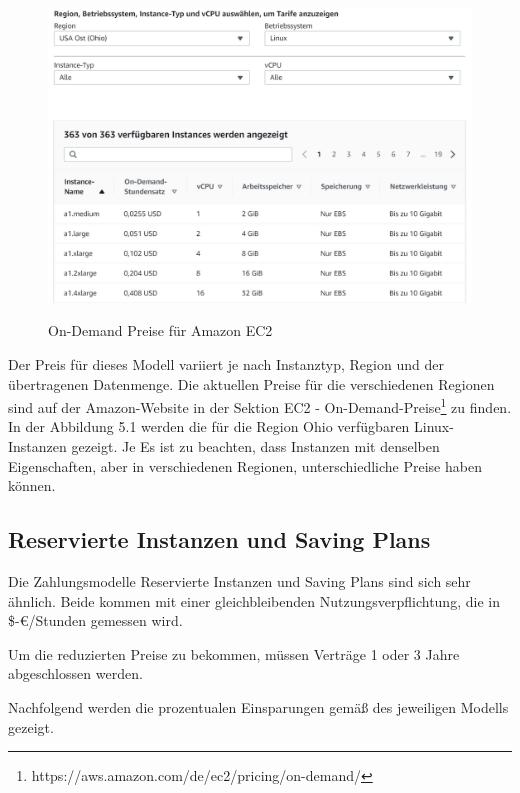 
\begin{figure}
    \centering
    \includegraphics[scale=0.4]{sources/On-Demand-Pläne für Amazon EC2}\label{fig:OnDemand_Preise}\\
    \caption[On-Demand Preise für Amazon EC2]{}
    \label{fig:OnDemand_Preise}  On-Demand Preise für Amazon EC2 {\cite{AMZ02}}
  \end{figure}


Der Preis für dieses Modell variiert je nach Instanztyp, Region und der übertragenen Datenmenge. 
Die aktuellen Preise für die verschiedenen Regionen sind auf der Amazon-Website in der Sektion EC2 - On-Demand-Preise\footnote{https://aws.amazon.com/de/ec2/pricing/on-demand/} zu finden.
In der Abbildung 5.1 werden die für die Region Ohio verfügbaren Linux-Instanzen gezeigt. Je Es ist zu beachten, dass Instanzen mit denselben Eigenschaften, aber in verschiedenen Regionen, unterschiedliche Preise haben können.

\subsection{Reservierte Instanzen und Saving Plans}
\begin{flushleft}
    Die Zahlungsmodelle Reservierte Instanzen und Saving Plans sind sich sehr ähnlich. Beide kommen mit einer gleichbleibenden  Nutzungsverpflichtung, die in \$-€/Stunden gemessen wird.

    Um die reduzierten Preise  zu bekommen, müssen Verträge 1 oder 3 Jahre abgeschlossen werden.

    Nachfolgend werden die prozentualen Einsparungen gemäß des jeweiligen Modells gezeigt.
\end{flushleft}

